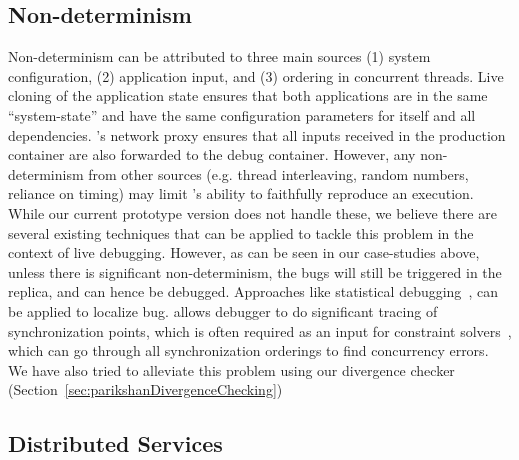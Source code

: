\subsection{Non-determinism} 
\label{sec:parikshanThreatsNonDeterminism}
Non-determinism can be attributed to three main sources (1) system configuration, (2) application input, and (3) ordering in concurrent threads.
Live cloning of the application state ensures that both applications are in the same ``system-state'' and have the same configuration parameters for itself and all dependencies.
\parikshan's network proxy ensures that all inputs received in the production container are also forwarded to the debug container.
However, any non-determinism from other sources (e.g. thread interleaving, random numbers, reliance on timing) may limit \parikshan's ability to faithfully reproduce an execution. 
While our current prototype version does not handle these, we believe there are several existing techniques that can be applied to tackle this problem in the context of live debugging.
However, as can be seen in our case-studies above, unless there is significant non-determinism, the bugs will still be triggered in the replica, and can hence be debugged. 
Approaches like statistical debugging~\cite{Liblit:2004:CBI}, can be applied to localize bug.
\parikshan allows debugger to do significant tracing of synchronization points, which is often required as an input for constraint solvers~\cite{dpor,best}, which can go through all synchronization orderings to find concurrency errors.
We have also tried to alleviate this problem using our divergence checker (Section~\ref{sec:parikshanDivergenceChecking})


\subsection{Distributed Services} 
\label{sec:parikshanThreatsDirstributed}

